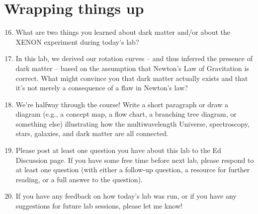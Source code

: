\documentclass[11pt]{article}%
\begin{document}
\section{Wrapping things up}
\begin{enumerate}
\setcounter{enumi}{15}

\item What are two things you learned about dark matter and/or about the XENON experiment during today's lab?
 

\item In this lab, we derived our rotation curves -- and thus inferred the presence of dark matter -- based on the assumption that Newton's Law of Gravitation is correct. What might convince you that dark matter actually exists and that it's not merely a consequence of a flaw in Newton's law? 

\item We're halfway through the course! Write a short paragraph or draw a diagram (e.g., a concept map, a flow chart, a branching tree diagram, or something else) illustrating how the multiwavelength Universe, spectroscopy, stars, galaxies, and dark matter are all connected. 

\item Please post at least one question you have about this lab to the Ed Discussion page. If you have some free time before next lab, please respond to at least one question (with either a follow-up question, a resource for further reading, or a full answer to the question). 

\item If you have any feedback on how today's lab was run, or if you have any suggestions for future lab sessions, please let me know!

\end{enumerate}
\end{document}
